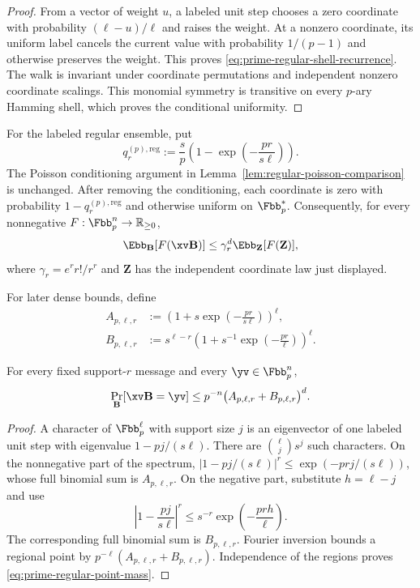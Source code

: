 \begin{proof}
From a vector of weight $u$, a labeled unit step chooses a zero coordinate
with probability $(\ell-u)/\ell$ and raises the weight.  At a nonzero
coordinate, its uniform label cancels the current value with probability
$1/(p-1)$ and otherwise preserves the weight.  This proves
\eqref{eq:prime-regular-shell-recurrence}.  The walk is invariant under
coordinate permutations and independent nonzero coordinate scalings.  This
monomial symmetry is transitive on every $p$-ary Hamming shell, which proves
the conditional uniformity.
\end{proof}

For the labeled regular ensemble, put
\begin{equation}
 q^{(p),\mathrm{reg}}_r
 :=\frac{s}{p}\left(1-
       \exp\left(-\frac{pr}{s\ell}\right)\right).
 \label{eq:prime-regular-poisson-activation}
\end{equation}
The Poisson conditioning argument in
Lemma~\ref{lem:regular-poisson-comparison} is unchanged.  After removing the
conditioning, each coordinate is zero with probability
$1-q^{(p),\mathrm{reg}}_r$ and otherwise uniform on $\Fbb_p^*$.  Consequently,
for every nonnegative $F:\Fbb_p^n\to\mathbb R_{\geq0}$,
\begin{equation}
 \Ebb_{\B}[F(\xv\B)]
 \leq \gamma_r^d\Ebb_{\mathbf Z}[F(\mathbf Z)],
 \label{eq:prime-regular-poisson-comparison}
\end{equation}
where $\gamma_r=e^r r!/r^r$ and $\mathbf Z$ has the independent coordinate law
just displayed.

For later dense bounds, define
\begin{align}
 A_{p,\ell,r}
 &:=\left(1+s\exp\left(-\frac{pr}{s\ell}\right)\right)^\ell,
 \nonumber\\
 B_{p,\ell,r}
 &:=s^{\ell-r}
   \left(1+s^{-1}\exp\left(-\frac{pr}{\ell}\right)\right)^\ell.
 \label{eq:prime-regular-fourier-terms}
\end{align}

\begin{lemma}
\label{lem:prime-regular-point-mass}
For every fixed support-$r$ message and every $\yv\in\Fbb_p^n$,
\begin{equation}
 \Pr_{\B}[\xv\B=\yv]
 \leq p^{-n}\bigl(A_{p,\ell,r}+B_{p,\ell,r}\bigr)^d.
 \label{eq:prime-regular-point-mass}
\end{equation}
\end{lemma}

\begin{proof}
A character of $\Fbb_p^\ell$ with support size $j$ is an eigenvector of one
labeled unit step with eigenvalue
$1-pj/(s\ell)$.  There are $\binom{\ell}{j}s^j$ such characters.  On the
nonnegative part of the spectrum,
$|1-pj/(s\ell)|^r\leq\exp(-prj/(s\ell))$, whose full binomial sum is
$A_{p,\ell,r}$.  On the negative part, substitute $h=\ell-j$ and use
\[
 \left|1-\frac{pj}{s\ell}\right|^r
 \leq s^{-r}\exp\left(-\frac{prh}{\ell}\right).
\]
The corresponding full binomial sum is $B_{p,\ell,r}$.  Fourier inversion
bounds a regional point by
$p^{-\ell}(A_{p,\ell,r}+B_{p,\ell,r})$.  Independence of the regions proves
\eqref{eq:prime-regular-point-mass}.
\end{proof}

